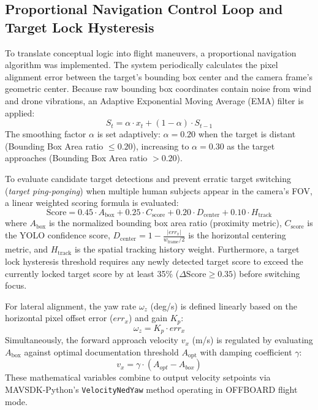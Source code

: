\documentclass[conference]{IEEEtran}
\begin{document}
\subsection{Proportional Navigation Control Loop and Target Lock Hysteresis}
To translate conceptual logic into flight maneuvers, a proportional navigation algorithm was implemented. The system periodically calculates the pixel alignment error between the target's bounding box center and the camera frame's geometric center. Because raw bounding box coordinates contain noise from wind and drone vibrations, an Adaptive Exponential Moving Average (EMA) filter is applied:
\begin{equation}
S_t = \alpha \cdot x_t + (1 - \alpha) \cdot S_{t-1}
\end{equation}
The smoothing factor $\alpha$ is set adaptively: $\alpha = 0.20$ when the target is distant (Bounding Box Area ratio $\leq 0.20$), increasing to $\alpha = 0.30$ as the target approaches (Bounding Box Area ratio $> 0.20$).

To evaluate candidate target detections and prevent erratic target switching (\textit{target ping-ponging}) when multiple human subjects appear in the camera's FOV, a linear weighted scoring formula is evaluated:
\begin{equation}
\text{Score} = 0.45 \cdot A_{\text{box}} + 0.25 \cdot C_{\text{score}} + 0.20 \cdot D_{\text{center}} + 0.10 \cdot H_{\text{track}}
\end{equation}
where $A_{\text{box}}$ is the normalized bounding box area ratio (proximity metric), $C_{\text{score}}$ is the YOLO confidence score, $D_{\text{center}} = 1 - \frac{|err_x|}{w_{\text{frame}}/2}$ is the horizontal centering metric, and $H_{\text{track}}$ is the spatial tracking history weight. Furthermore, a target lock hysteresis threshold requires any newly detected target score to exceed the currently locked target score by at least 35\% ($\Delta \text{Score} \geq 0.35$) before switching focus.

For lateral alignment, the yaw rate $\omega_z$ (deg/s) is defined linearly based on the horizontal pixel offset error ($err_x$) and gain $K_p$:
\begin{equation}
\omega_z = K_p \cdot err_x 
\end{equation}
Simultaneously, the forward approach velocity $v_x$ (m/s) is regulated by evaluating $A_{\text{box}}$ against optimal documentation threshold $A_{\text{opt}}$ with damping coefficient $\gamma$:
\begin{equation}
v_x = \gamma \cdot \left( A_{opt} - A_{box} \right)
\end{equation}
These mathematical variables combine to output velocity setpoints via MAVSDK-Python's \texttt{VelocityNedYaw} method operating in OFFBOARD flight mode.
\end{document}
